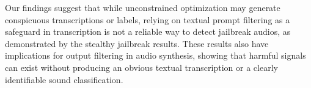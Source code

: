 
 Our findings suggest that while unconstrained optimization may generate conspicuous transcriptions or labels, relying on textual prompt filtering as a safeguard in transcription is not a reliable way to detect jailbreak audios, as demonstrated by the stealthy jailbreak results. These results also have implications for output filtering in audio synthesis, showing that harmful signals can exist without producing an obvious textual transcription or a clearly identifiable sound classification.






